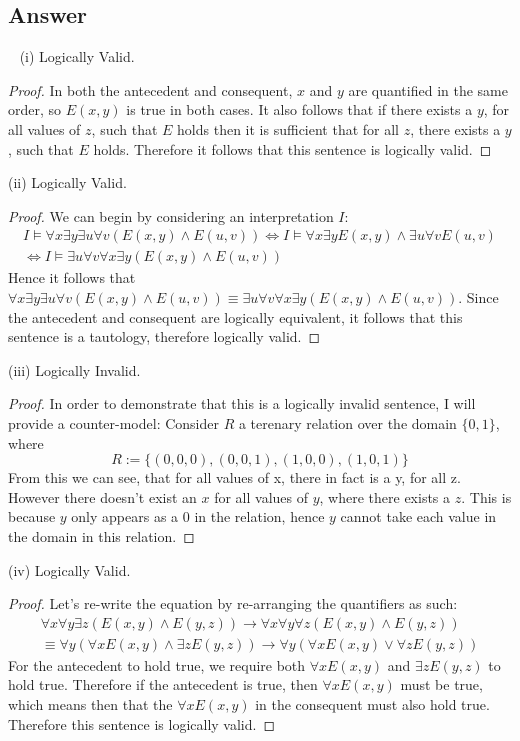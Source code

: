 \documentclass[12pt]{fphw}
\begin{document}
\subsection*{Answer} \ \newline
(i) Logically Valid.
\begin{proof}
    In both the antecedent and consequent, $x$ and $y$ are quantified in the same order, so $E(x,y)$ is true in both cases. It also follows that if there exists a $y$, for all values of $z$, such that $E$ holds then it is sufficient that for all $z$, there exists a $y$, such that $E$ holds.
    Therefore it follows that this sentence is logically valid.
\end{proof}  \noindent
(ii) Logically Valid.
\begin{proof}
    We can begin by considering an interpretation $I$:
    \begin{gather*}
        I \models \forall x \exists y \exists u \forall v (E(x,y) \wedge E(u,v)) \iff I \models \forall x \exists y E(x,y) \wedge \exists u \forall v E(u, v) \\ 
        \iff I \models \exists u \forall v \forall x \exists y (E(x,y) \wedge E(u,v))
    \end{gather*}
    Hence it follows that $\forall x \exists y \exists u \forall v (E(x,y) \wedge E(u,v)) \equiv \exists u \forall v \forall x \exists y(E(x,y) \wedge E(u,v))$. Since the antecedent and consequent are logically equivalent, it follows that this sentence is a tautology, therefore logically valid.
\end{proof} \noindent
(iii) Logically Invalid.
\begin{proof}
In order to demonstrate that this is a logically invalid sentence, I will provide a counter-model: Consider $R$ a terenary relation over the domain $\{0, 1\}$, where
$$
R := \{(0,0,0),(0,0,1),(1,0,0),(1,0,1)\}
$$
From this we can see, that for all values of x, there in fact is a y, for all z. However there doesn't exist an $x$ for all values of $y$, where there exists a $z$. This is because $y$ only appears as a $0$ in the relation, hence $y$ cannot take each value in the domain in this relation.
\end{proof} \noindent
(iv) Logically Valid.
\begin{proof}
    Let's re-write the equation by re-arranging the quantifiers as such:
    \begin{gather*}
        \forall x \forall y \exists z (E(x,y) \wedge E(y,z)) \to \forall x \forall y \forall z (E(x,y) \wedge E(y,z)) \\ 
        \equiv \forall y (\forall x E(x,y) \wedge \exists z E(y,z)) \to \forall y (\forall x E(x,y) \vee \forall z E(y,z))
    \end{gather*}
    For the antecedent to hold true, we require both $\forall x E(x,y)$ and $\exists z E(y,z)$ to hold true. Therefore if the antecedent is true, then $\forall x E(x,y)$ must be true, which means then that the $\forall x E(x,y)$ in the consequent must also hold true. Therefore this sentence is logically valid.
\end{proof} \noindent
\end{document}
